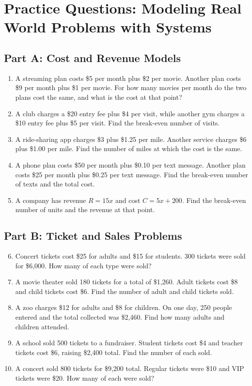 \documentclass[14pt]{extarticle}
\begin{document}
\section*{Practice Questions: Modeling Real World Problems with Systems}

\subsection*{Part A: Cost and Revenue Models}
\begin{enumerate}
  \item A streaming plan costs \$5 per month plus \$2 per movie. Another plan costs \$9 per month plus \$1 per movie. For how many movies per month do the two plans cost the same, and what is the cost at that point?
  \item A club charges a \$20 entry fee plus \$4 per visit, while another gym charges a \$10 entry fee plus \$5 per visit. Find the break-even number of visits.
  \item A ride-sharing app charges \$3 plus \$1.25 per mile. Another service charges \$6 plus \$1.00 per mile. Find the number of miles at which the cost is the same.
  \item A phone plan costs \$50 per month plus \$0.10 per text message. Another plan costs \$25 per month plus \$0.25 per text message. Find the break-even number of texts and the total cost.
  \item A company has revenue \(R = 15x\) and cost \(C = 5x + 200\). Find the break-even number of units and the revenue at that point.
\end{enumerate}

\subsection*{Part B: Ticket and Sales Problems}
\begin{enumerate}
  \setcounter{enumi}{5}
  \item Concert tickets cost \$25 for adults and \$15 for students. 300 tickets were sold for \$6,000. How many of each type were sold?
  \item A movie theater sold 180 tickets for a total of \$1,260. Adult tickets cost \$8 and child tickets cost \$6. Find the number of adult and child tickets sold.
  \item A zoo charges \$12 for adults and \$8 for children. On one day, 250 people entered and the total collected was \$2,460. Find how many adults and children attended.
  \item A school sold 500 tickets to a fundraiser. Student tickets cost \$4 and teacher tickets cost \$6, raising \$2,400 total. Find the number of each sold.
  \item A concert sold 800 tickets for \$9,200 total. Regular tickets were \$10 and VIP tickets were \$20. How many of each were sold?
\end{enumerate}
\end{document}
